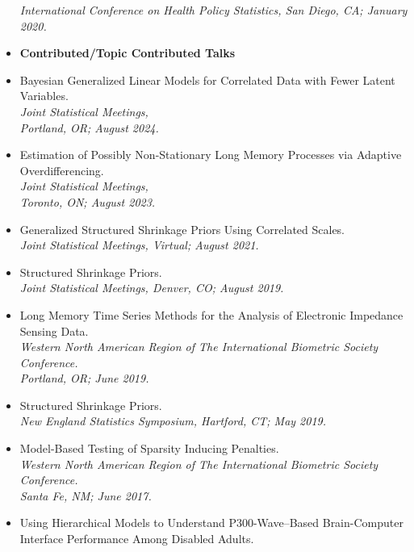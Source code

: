 \documentclass[11pt]{article}
\newcommand{\tab}{\hspace*{2em}}
\begin{document}
\begin{itemize}
	\tab \emph{International Conference on Health Policy Statistics, San Diego, CA; January 2020.} \vspace{-2mm}
	\item[] \textbf{Contributed/Topic Contributed Talks} \vspace{-2mm}
	\item[] Bayesian Generalized Linear Models for Correlated Data with Fewer Latent Variables. \\
	\tab \emph{Joint Statistical Meetings,} \\
	\tab \emph{Portland, OR; August 2024.} \vspace{-2mm}
	\item[] Estimation of Possibly Non-Stationary Long Memory Processes via Adaptive Overdifferencing. \\
	\tab \emph{Joint Statistical Meetings,} \\
	\tab \emph{Toronto, ON; August 2023.} \vspace{-2mm}
	\item[] Generalized Structured Shrinkage Priors Using Correlated Scales. \\
	\tab \emph{Joint Statistical Meetings, Virtual; August 2021.} \vspace{-2mm}
	\item[] Structured Shrinkage Priors. \\
	\tab \emph{Joint Statistical Meetings, Denver, CO; August 2019.} \vspace{-2mm}
	\item[] Long Memory Time Series Methods for the Analysis of Electronic Impedance Sensing Data. \\
	\tab \emph{Western North American Region of The International Biometric Society Conference.} \\
	\tab \emph{Portland, OR; June 2019.} \vspace{-2mm}
	\item[] Structured Shrinkage Priors. \\
	\tab \emph{New England Statistics Symposium, Hartford, CT; May 2019.} \vspace{-2mm}
	\item[] Model-Based Testing of Sparsity Inducing Penalties. \\
	\tab \emph{Western North American Region of The International Biometric Society Conference.} \\
	\tab \emph{Santa Fe, NM; June 2017.} \vspace{-2mm}
	\item[] Using Hierarchical Models to Understand P300-Wave--Based Brain-Computer Interface Performance Among Disabled Adults. \\

\end{itemize}
\end{document}
